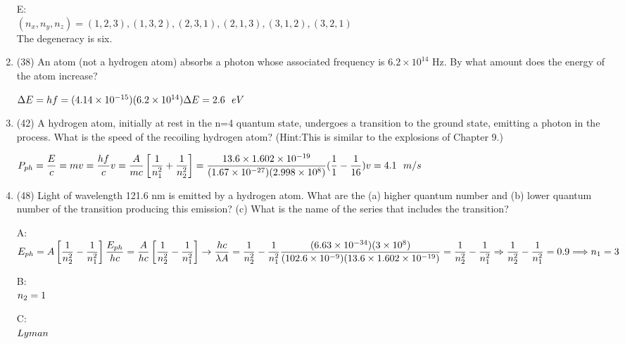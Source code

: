 \documentclass[fleqn]{article}
\begin{document}
\begin{enumerate}
      \textcolor{hwColor}{
        E: \\
        $
          (n_x, n_y, n_z)=(1,2,3), (1,3,2), (2,3,1), (2,1,3), (3,1,2), (3,2,1)
        $ \\
        The degeneracy is six. 
      }

    \item (38) An atom (not a hydrogen atom) absorbs a photon whose associated frequency is $6.2 \times 10^{14}$ Hz. By what amount does the energy of the atom increase?

      \textcolor{hwColor}{
        $
         \Delta E=hf=(4.14 \times 10^{-15})(6.2 \times 10^{14}) \\
         \\
         \Delta E=2.6 ~~ eV
        $
      }

    \item (42) A hydrogen atom, initially at rest in the n=4 quantum state, undergoes a transition to the ground state, emitting a photon
    in the process. What is the speed of the recoiling hydrogen atom?
    (Hint:This is similar to the explosions of Chapter 9.)

      \textcolor{hwColor}{
        $
          P_{ph}=\dfrac{E}{c}=mv=\dfrac{hf}{c} \\
          \\
          v=\dfrac{A}{mc}\left[\dfrac{1}{n^2_1}+\dfrac{1}{n^2_2}\right]=\dfrac{13.6 \times 1.602 \times 10^{-19}}{(1.67 \times 10^{-27})(2.998 \times 10^{8})}(\dfrac{1}{1}-\dfrac{1}{16}) \\
          \\
          v=4.1 ~~ m/s
        $
      }

    \item (48) Light of wavelength 121.6 nm is emitted by a hydrogen atom. What are the (a) higher quantum number and (b) lower
    quantum number of the transition producing this emission? (c) What is the name of the series that includes the transition?

      \textcolor{hwColor}{
        A: \\
        $
          E_{ph}=A\left[\dfrac{1}{n^2_2}-\dfrac{1}{n^2_1}\right] \\
          \\
          \dfrac{E_{ph}}{hc}=\dfrac{A}{hc}\left[\dfrac{1}{n^2_2}-\dfrac{1}{n^2_1}\right] \rightarrow \dfrac{hc}{\lambda A}=\dfrac{1}{n^2_2}-\dfrac{1}{n^2_1} \\
          \\
          \dfrac{(6.63 \times 10^{-34})(3 \times 10^8)}{(102.6 \times 10^{-9})(13.6 \times 1.602 \times 10^{-19})}=\dfrac{1}{n^2_2}-\dfrac{1}{n^2_1} \\
          \\
          \Rightarrow \dfrac{1}{n^2_2}-\dfrac{1}{n^2_1}=0.9 \Longrightarrow n_1=3 \\
        $
      }

      \textcolor{hwColor}{
        B: \\
        $
          n_2=1 \\
        $
      }

      \textcolor{hwColor}{
        C: \\
        $
          Lyman \\
        $
      }



  \end{enumerate}
\end{document}
